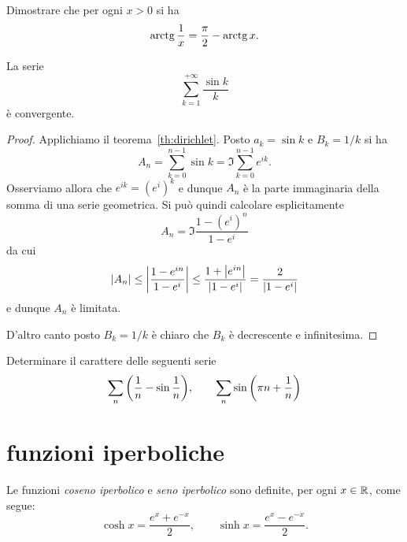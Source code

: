 \begin{exercise}
Dimostrare che per ogni $x>0$ si ha
\[
  \operatorname{arctg} \frac 1 x = \frac \pi 2 - \operatorname{arctg} x.
\]
\end{exercise}

\begin{exercise}
La serie
\[
  \sum_{k=1}^{+\infty} \frac{\sin k}{k}
\]
è convergente.
\end{exercise}
\begin{proof}
Applichiamo il teorema~\ref{th:dirichlet}.
Posto $a_k = \sin k$ e $B_k=1/k$
si ha
\[
  A_n = \sum_{k=0}^{n-1} \sin k = \Im \sum_{k=0}^{n-1} e^{ik}.
\]
Osserviamo allora che $e^{ik}=(e^i)^k$ e dunque $A_n$ è la parte immaginaria
della somma di una serie geometrica. 
Si può quindi calcolare esplicitamente
\[
  A_n = \Im \frac{1-(e^i)^n}{1-e^i}
\]
da cui
\[
  {\left|A_n\right|} \le {\left|\frac{1-e^{in}}{1-e^i}\right|} \le \frac{1+{\left|e^{in}\right|}}{{\left|1-e^i\right|}}
  = \frac{2}{{\left|1-e^i\right|}}
\]
e dunque $A_n$ è limitata.

D'altro canto posto $B_k = 1/k$ è chiaro che $B_k$ è
decrescente e infinitesima.
\end{proof}

\begin{exercise}
Determinare il carattere delle seguenti serie
\[
  \sum_n {\left( \frac 1 n - \sin \frac 1 n \right)},\qquad
  \sum_n \sin{\left( \pi n + \frac 1 n \right)}
\]
\end{exercise}

\section{funzioni iperboliche}

\begin{definition}
Le funzioni
\emph{coseno iperbolico} e \emph{seno iperbolico}
sono definite, per ogni $x\in {\mathbb R}$,
come segue:
\mymargin{$\sinh$, $\cosh$}%
%
%
%
\index{$\sinh$}%
\index{$\cosh$}%
\begin{equation}
\label{eq:sinh_cosh}
  \cosh x = \frac{e^x + e^{-x}}{2},
  \qquad
  \sinh x = \frac{e^x - e^{-x}}{2}.
\end{equation}
\end{definition}

